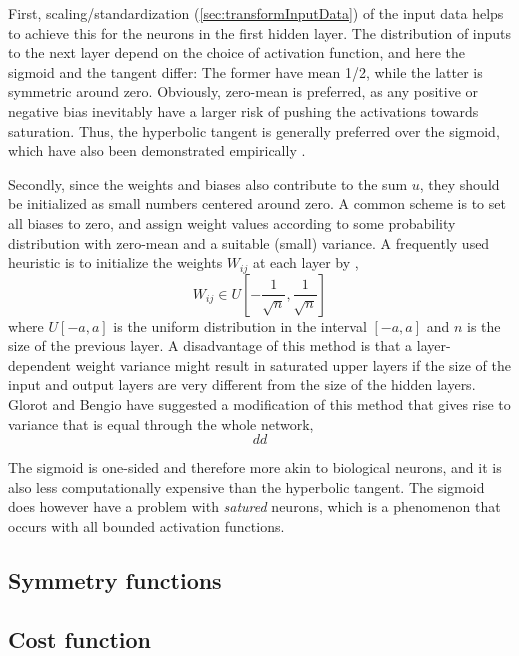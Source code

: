 \documentclass[twoside,english]{uiofysmaster}
\begin{document}
First, scaling/standardization (\autoref{sec:transformInputData}) of the input data helps to achieve this for
the neurons in the first hidden layer. The distribution of inputs to the next layer depend on the choice of activation function, and 
here the sigmoid and the tangent differ: The former have mean 1/2, while the latter is symmetric around zero. 
Obviously, zero-mean is preferred, as any positive or negative bias inevitably have a larger risk of pushing the activations 
towards saturation. Thus, the hyperbolic tangent is generally preferred over the sigmoid, which have also been demonstrated 
empirically \cite{Karlik11} \cite{Glorot10}. 

Secondly, since the weights and biases also contribute to the sum $u$, they should be initialized as small numbers centered around zero. 
A common scheme is to 
set all biases to zero, and assign weight values according to some probability distribution with zero-mean and 
a suitable (small) variance. A frequently used heuristic is to initialize the weights $W_{ij}$ at each layer by 
\cite{Bengio12} \cite{LeCun12},
\begin{equation}
 W_{ij} \in U\left[-\frac{1}{\sqrt{n}}, \frac{1}{\sqrt{n}}\right]
\end{equation}
where $U[-a, a]$ is the uniform distribution in the interval $[-a,a]$ and $n$ is the size of the previous layer.
A disadvantage of this method is that a layer-dependent weight variance might result in saturated upper layers
if the size of the input and output layers are very different from the size of the hidden layers. 
Glorot and Bengio \cite{Glorot10} have suggested a modification of this method that gives rise to variance that 
is equal through the whole network, 
\begin{equation}
 dd
\end{equation}



The sigmoid is one-sided and therefore more akin to 
biological neurons, and it is also less computationally expensive than the hyperbolic tangent. 
The sigmoid does however have a problem with \textit{satured} neurons, which is a phenomenon that occurs with 
all bounded activation functions. 


\subsection{Symmetry functions}

\subsection{Cost function}
\end{document}
